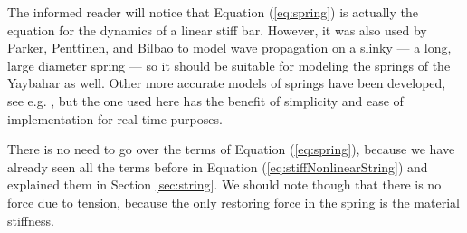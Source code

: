 \documentclass{article}
\begin{document}
The informed reader will notice that Equation (\ref{eq:spring}) is actually the equation for the dynamics of a linear stiff bar\cite{bilbao_modular_2009}\cite[Chapter~7]{bilbao_numerical_2009}.
However, it was also used by Parker, Penttinen, and Bilbao to model wave propagation on a slinky --- a long, large diameter spring --- so it should be suitable for modeling the springs of the Yaybahar as well\cite{parker_modeling_2010}.
Other more accurate models of springs have been developed, see e.g. \cite{parker_spring_2009}, but the one used here has the benefit of simplicity and ease of implementation for real-time purposes.

There is no need to go over the terms of Equation (\ref{eq:spring}), because we have already seen all the terms before in Equation (\ref{eq:stiffNonlinearString}) and explained them in Section \ref{sec:string}.
We should note though that there is no force due to tension, because the only restoring force in the spring is the material stiffness.
\end{document}
